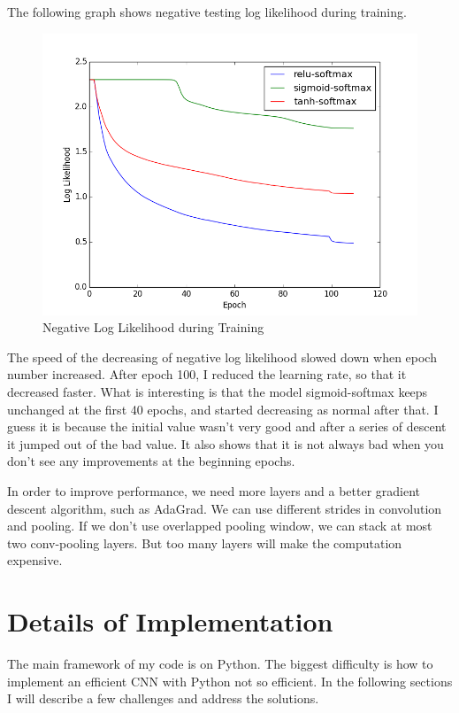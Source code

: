 \documentclass{article} %
\begin{document}
The following graph shows negative testing log likelihood during training.

\begin{figure}[h]
	\centering
		\includegraphics[width=.9\textwidth]{cnn.png}
	\caption{Negative Log Likelihood during Training}
	\label{fig:cnn}
\end{figure}

The speed of the decreasing of negative log likelihood slowed down when epoch number increased. After epoch 100, I reduced the learning rate, so that it decreased faster. What is interesting is that the model sigmoid-softmax keeps unchanged at the first 40 epochs, and started decreasing as normal after that. I guess it is because the initial value wasn't very good and after a series of descent it jumped out of the bad value. It also shows that it is not always bad when you don't see any improvements at the beginning epochs.

In order to improve performance, we need more layers and a better gradient descent algorithm, such as AdaGrad. We can use different strides in convolution and pooling. If we don't use overlapped pooling window, we can stack at most two conv-pooling layers. But too many layers will make the computation expensive.

\section{Details of Implementation}

\label{sec:Implementation}

The main framework of my code is on Python. The biggest difficulty is how to implement an efficient CNN with Python not so efficient. In the following sections I will describe a few challenges and address the solutions.
\end{document}
